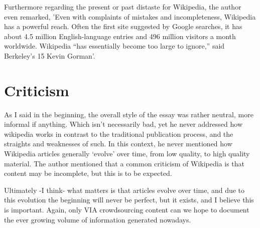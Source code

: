 Furthermore regarding the present or past distaste for Wikipedia, the author even remarked, ’Even with complaints of mistakes and incompleteness, Wikipedia has a powerful reach. Often the first site suggested by Google searches, it has about 4.5 million English-language entries and 496 million visitors a month worldwide. Wikipedia “has essentially become too large to ignore,” said Berkeley’s 15 Kevin Gorman’.


\section*{Criticism}

As I said in the beginning, the overall style of the essay was rather neutral, more informal if anything. Which isn’t necessarily bad, yet he never addressed how wikipedia works in contrast to the traditional publication process, and the straights and weaknesses of such. In this context, he never mentioned how Wikipedia articles generally ‘evolve’ over time, from low quality, to high quality material. The author mentioned that a common criticism of Wikipedia is that content may be incomplete, but this is to be expected.

Ultimately -I think- what matters is that articles evolve over time, and due to this evolution the beginning will never be perfect, but it exists, and I believe this is important. Again, only VIA crowdsourcing content can we hope to document the ever growing volume of information generated nowadays.

